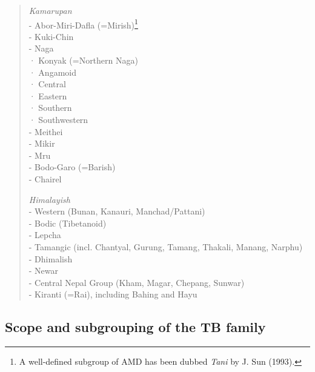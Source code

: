 \begin{quote}
\textit{Kamarupan}\\
- Abor-Miri-Dafla (=Mirish)\footnote{A well-defined subgroup of AMD has been
dubbed \textit{Tani} by J. Sun (1993).}\\
- Kuki-Chin\\
- Naga\\
\hspace*{3ex}· Konyak (=Northern Naga)\\
\hspace*{3ex}· Angamoid\\
\hspace*{3ex}· Central\\
\hspace*{3ex}· Eastern\\
\hspace*{3ex}· Southern\\
\hspace*{3ex}· Southwestern\\
- Meithei\\
- Mikir\\
- Mru\\
- Bodo-Garo (=Barish)\\
- Chairel

\textit{Himalayish}\\
- Western (Bunan, Kanauri, Manchad/Pattani)\\
- Bodic (Tibetanoid)\\
- Lepcha\\
- Tamangic (incl. Chantyal, Gurung, Tamang, Thakali, Manang, Narphu)\\
- Dhimalish\\
- Newar\\
- Central Nepal Group (Kham, Magar, Chepang, Sunwar)\\
- Kiranti (=Rai), including Bahing and Hayu\\
\end{quote}

\subsection{Scope and subgrouping of the TB family}

